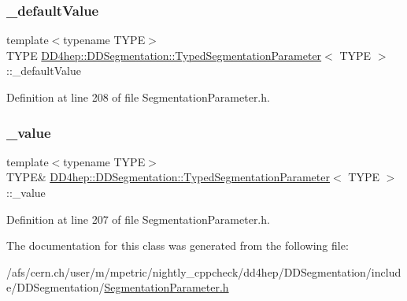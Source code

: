 \subsubsection{\texorpdfstring{\+\_\+default\+Value}{\_defaultValue}}
{\footnotesize\ttfamily template$<$typename T\+Y\+PE$>$ \\
T\+Y\+PE \hyperlink{class_d_d4hep_1_1_d_d_segmentation_1_1_typed_segmentation_parameter}{D\+D4hep\+::\+D\+D\+Segmentation\+::\+Typed\+Segmentation\+Parameter}$<$ T\+Y\+PE $>$\+::\+\_\+default\+Value\hspace{0.3cm}{\ttfamily [protected]}}



Definition at line 208 of file Segmentation\+Parameter.\+h.

\hypertarget{class_d_d4hep_1_1_d_d_segmentation_1_1_typed_segmentation_parameter_af22eb54e9ee1571cf874c2c05c641603}{}\label{class_d_d4hep_1_1_d_d_segmentation_1_1_typed_segmentation_parameter_af22eb54e9ee1571cf874c2c05c641603} 
\subsubsection{\texorpdfstring{\+\_\+value}{\_value}}
{\footnotesize\ttfamily template$<$typename T\+Y\+PE$>$ \\
T\+Y\+PE\& \hyperlink{class_d_d4hep_1_1_d_d_segmentation_1_1_typed_segmentation_parameter}{D\+D4hep\+::\+D\+D\+Segmentation\+::\+Typed\+Segmentation\+Parameter}$<$ T\+Y\+PE $>$\+::\+\_\+value\hspace{0.3cm}{\ttfamily [protected]}}



Definition at line 207 of file Segmentation\+Parameter.\+h.



The documentation for this class was generated from the following file\+:\begin{DoxyCompactItemize}
\item 
/afs/cern.\+ch/user/m/mpetric/nightly\+\_\+cppcheck/dd4hep/\+D\+D\+Segmentation/include/\+D\+D\+Segmentation/\hyperlink{_segmentation_parameter_8h}{Segmentation\+Parameter.\+h}\end{DoxyCompactItemize}
